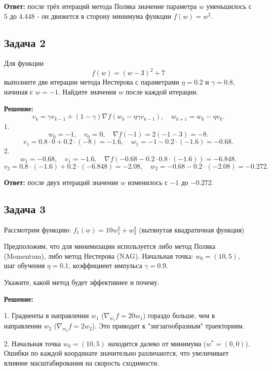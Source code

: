 \textbf{Ответ:} после трёх итераций метода Поляка значение параметра $w$ уменьшилось с 5 до $4.448$ - он движется в сторону минимума функции $f(w) = w^2$.

\subsection*{Задача 2}
Для функции
\begin{equation*}
	f(w) = (w - 3)^2 + 7
\end{equation*}
выполните две итерации метода Нестерова с параметрами $\eta = 0.2$ и $\gamma = 0.8$, начиная с $w = -1$. Найдите значения $w$ после каждой итерации.

\textbf{Решение:}
\begin{equation*}
	v_k = \gamma v_{k-1} + (1 - \gamma) \nabla f(w_k - \eta \gamma v_{k-1}), \quad w_{k+1} = w_k - \eta v_k.
\end{equation*}
1.
\[
	w_0 = -1, \quad v_0 = 0, \quad \nabla f(-1) = 2(-1 - 3) = -8.
\]
\[ v_1 = 0.8 \cdot 0 + 0.2 \cdot (-8) = -1.6, \quad w_1 = -1 - 0.2 \cdot (-1.6) = -0.68. \]
2.
\[
	w_1 = -0.68, \quad v_1 = -1.6, \quad \nabla f(-0.68 - 0.2 \cdot 0.8 \cdot (-1.6)) = -6.848.
\]
\[ v_2 = 0.8 \cdot (-1.6) + 0.2 \cdot (-6.848) = -2.08, \quad w_2 = -0.68 - 0.2 \cdot (-2.08) = -0.272. \]

\textbf{Ответ:} после двух итераций значение $w$ изменилось с $-1$ до $-0.272$.

\subsection*{Задача 3}
Рассмотрим функцию:
\( f_1(w) = 10w_1^2 + w_2^2 \) (вытянутая квадратичная функция)

Предположим, что для минимизации используется либо метод Поляка (Momentum), либо метод Нестерова (NAG).
Начальная точка: \( w_0 = (10, 5) \),  шаг обучения \( \eta = 0.1 \),   коэффициент импульса \( \gamma = 0.9 \).

Укажите, какой метод будет эффективнее и почему.

\textbf{Решение:}

1. Градиенты в направлении \( w_1 \) (\( \nabla_{w_1} f = 20w_1 \)) гораздо больше, чем в направлении \( w_2 \) (\( \nabla_{w_2} f = 2w_2 \)). Это приводит к "зигзагообразным" траекториям.

2. Начальная точка \( w_0 = (10, 5) \) находится далеко от минимума (\( w^* = (0, 0) \)). Ошибки по каждой координате значительно различаются, что увеличивает влияние масштабирования на скорость сходимости.

